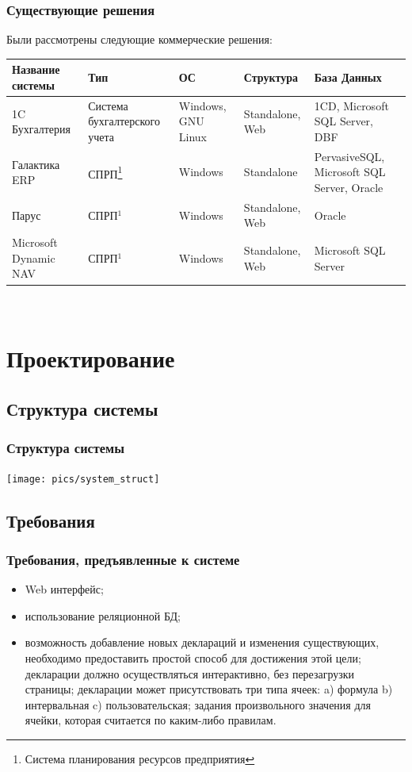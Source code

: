 \documentclass[xcolor=pdftex, dvipsnames, table]{beamer}
\begin{document}
\begin{frame}
  \frametitle{Существующие решения}
  Были рассмотрены следующие коммерческие решения:
  \begin{center}
    \small {
      \begin{tabular}{|p{2cm}|p{2cm}|p{1.5cm}|p{1.6cm}|p{2.3cm}|}\hline
        \bfseries{Название системы} &
        \bfseries{Тип} &
        \bfseries{ОС} &
        \bfseries{Структура} &
        \bfseries{База Данных}\\
        \hline
        1C Бухгалтерия & Система бухгалтерского учета & Windows, GNU Linux & Standalone, Web & 1CD, Microsoft SQL Server, DBF\\
        \hline
        Галактика ERP & СПРП\footnote[1]{Система планирования ресурсов предприятия\label{erp}} & Windows  & Standalone  & PervasiveSQL, Microsoft SQL Server, Oracle\\
        \hline
        Парус & СПРП$^{1}$ & Windows & Standalone, Web & Oracle\\
        \hline
        Microsoft Dynamic NAV & СПРП$^{1}$ & Windows & Standalone, Web & Microsoft SQL Server\\
        \hline
      \end{tabular}
    }
  \end{center}
  \\
\end{frame}

\section{Проектирование}
\subsection{Структура системы}
\begin{frame}
  \frametitle{Структура системы}
  \begin{center}
    \texttt{[image: pics/system\_struct]}
  \end{center}
\end{frame}
\subsection{Требования}
\begin{frame}
  \frametitle{Требования, предъявленные к системе}
  \begin{itemize}
    \item Web интерфейс;
    \item использование реляционной БД;
    \item возможность добавление новых деклараций и изменения существующих, необходимо предоставить простой способ для достижения этой цели;
     декларации должно осуществляться интерактивно, без перезагрузки страницы;
     декларации может присутствовать три типа ячеек: a) формула b) интервальная c) пользовательская;
     задания произвольного значения для ячейки, которая считается по каким-либо правилам.
  \end{itemize}
\end{frame}
\end{document}
